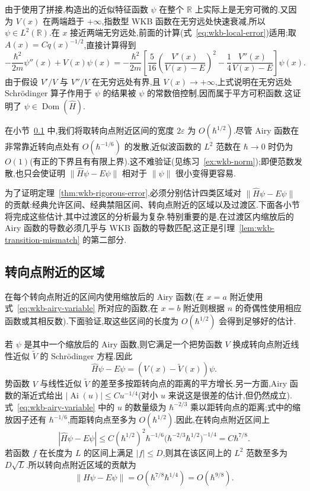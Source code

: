 由于使用了拼接,构造出的近似特征函数 $\psi$ 在整个 $\mathbb R$ 上实际上是无穷可微的.又因为 $V(x)$ 在两端趋于 $+\infty$,指数型 WKB 函数在无穷远处快速衰减,所以 $\psi\in L^2(\mathbb R)$.在 $x$ 接近两端无穷远处,前面的计算(式~\eqref{eq:wkb-local-error})适用;取 $A(x)=Cq(x)^{-1/2}$,直接计算得到
\[
-\frac{\hbar^2}{2m}\psi''(x)+V(x)\psi(x)
=-\frac{\hbar^2}{2m}\left[
\frac5{16}\left(\frac{V'(x)}{V(x)-E}\right)^2
-\frac14\frac{V''(x)}{V(x)-E}
\right]\psi(x).
\label{eq:wkb-domain-error}
\]
由于假设 $V'/V$ 与 $V''/V$ 在无穷远处有界,且 $V(x)\to+\infty$,上式说明在无穷远处 Schrödinger 算子作用于 $\psi$ 的结果被 $\psi$ 的常数倍控制,因而属于平方可积函数.这证明了 $\psi\in\operatorname{Dom}(\widehat H)$.

在小节~\ref{subsec:wkb-turning-point-regions} 中,我们将取转向点附近区间的宽度 $2\varepsilon$ 为 $O(\hbar^{1/2})$.尽管 Airy 函数在非常靠近转向点处有 $O(\hbar^{-1/6})$ 的发散,近似波函数的 $L^2$ 范数在 $\hbar\to0$ 时仍为 $O(1)$(有正的下界且有有限上界).这不难验证(见练习~\ref{ex:wkb-norm});即便范数发散,也只会使证明 $\|\widehat H\psi-E\psi\|$ 相对于 $\|\psi\|$ 很小变得更容易.

为了证明定理~\ref{thm:wkb-rigorous-error},必须分别估计四类区域对 $\|\widehat H\psi-E\psi\|$ 的贡献:经典允许区间、经典禁阻区间、转向点附近的区域以及过渡区.下面各小节将完成这些估计,其中过渡区的分析最为复杂.特别重要的是,在过渡区内缩放后的 Airy 函数的导数必须几乎与 WKB 函数的导数匹配,这正是引理~\ref{lem:wkb-transition-mismatch} 的第二部分.

\subsection{转向点附近的区域}
\label{subsec:wkb-turning-point-regions}

在每个转向点附近的区间内使用缩放后的 Airy 函数(在 $x=a$ 附近使用式~\eqref{eq:wkb-airy-variable} 所对应的函数,在 $x=b$ 附近则根据 $n$ 的奇偶性使用相应函数或其相反数).下面验证,取这些区间的长度为 $O(\hbar^{1/2})$ 会得到足够好的估计.

若 $\psi$ 是其中一个缩放后的 Airy 函数,则它满足一个把势函数 $V$ 换成转向点附近线性近似 $\widetilde V$ 的 Schrödinger 方程.因此
\[
\widehat H\psi-E\psi=(V(x)-\widetilde V(x))\psi.
\label{eq:wkb-turning-residual}
\]
势函数 $V$ 与线性近似 $\widetilde V$ 的差至多按距转向点的距离的平方增长.另一方面,Airy 函数的渐近式给出 $|\operatorname{Ai}(u)|\leq Cu^{-1/4}$(对小 $u$ 来说这是很差的估计,但仍然成立).式~\eqref{eq:wkb-airy-variable} 中的 $u$ 的数量级为 $\hbar^{-2/3}$ 乘以距转向点的距离;式中的缩放因子还有 $\hbar^{-1/6}$,而距转向点至多为 $O(\hbar^{1/2})$.因此,在转向点附近区间上
\[
|\widehat H\psi-E\psi|
\leq C(\hbar^{1/2})^2\hbar^{-1/6}
\bigl(\hbar^{-2/3}\hbar^{1/2}\bigr)^{-1/4}
=C\hbar^{7/8}.
\]
若函数 $f$ 在长度为 $L$ 的区间上满足 $|f|\leq D$,则其在该区间上的 $L^2$ 范数至多为 $D\sqrt L$.所以转向点附近区域的贡献为
\[
\|\widehat H\psi-E\psi\|=O(\hbar^{7/8}\hbar^{1/4})=O(\hbar^{9/8}).
\label{eq:wkb-turning-error}
\]

